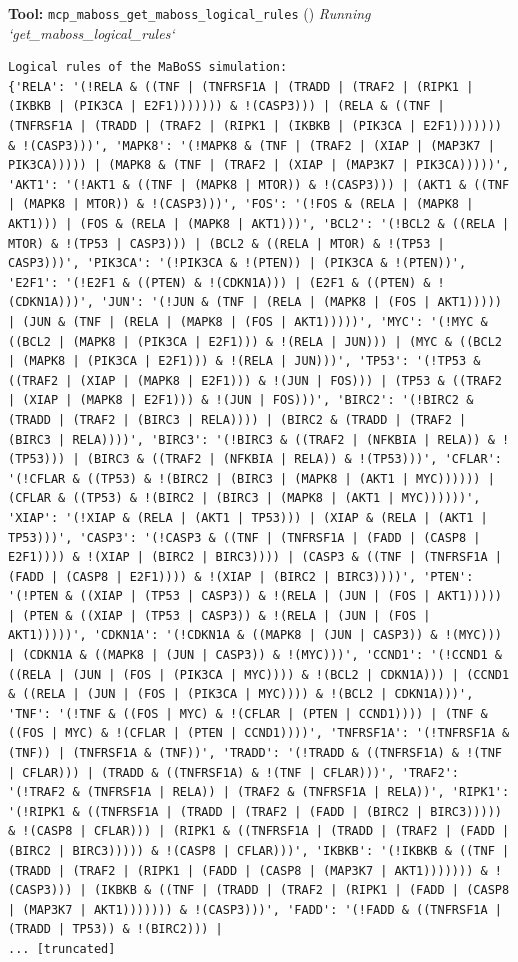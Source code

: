 \documentclass[11pt,a4paper]{article}
\begin{document}
\begin{toolokbox}
\textbf{Tool:} \texttt{mcp\_maboss\_get\_maboss\_logical\_rules} (\checkmark)
\textit{Running `get\_maboss\_logical\_rules`}
\begin{lstlisting}
Logical rules of the MaBoSS simulation:
{'RELA': '(!RELA & ((TNF | (TNFRSF1A | (TRADD | (TRAF2 | (RIPK1 | (IKBKB | (PIK3CA | E2F1))))))) & !(CASP3))) | (RELA & ((TNF | (TNFRSF1A | (TRADD | (TRAF2 | (RIPK1 | (IKBKB | (PIK3CA | E2F1))))))) & !(CASP3)))', 'MAPK8': '(!MAPK8 & (TNF | (TRAF2 | (XIAP | (MAP3K7 | PIK3CA))))) | (MAPK8 & (TNF | (TRAF2 | (XIAP | (MAP3K7 | PIK3CA)))))', 'AKT1': '(!AKT1 & ((TNF | (MAPK8 | MTOR)) & !(CASP3))) | (AKT1 & ((TNF | (MAPK8 | MTOR)) & !(CASP3)))', 'FOS': '(!FOS & (RELA | (MAPK8 | AKT1))) | (FOS & (RELA | (MAPK8 | AKT1)))', 'BCL2': '(!BCL2 & ((RELA | MTOR) & !(TP53 | CASP3))) | (BCL2 & ((RELA | MTOR) & !(TP53 | CASP3)))', 'PIK3CA': '(!PIK3CA & !(PTEN)) | (PIK3CA & !(PTEN))', 'E2F1': '(!E2F1 & ((PTEN) & !(CDKN1A))) | (E2F1 & ((PTEN) & !(CDKN1A)))', 'JUN': '(!JUN & (TNF | (RELA | (MAPK8 | (FOS | AKT1))))) | (JUN & (TNF | (RELA | (MAPK8 | (FOS | AKT1)))))', 'MYC': '(!MYC & ((BCL2 | (MAPK8 | (PIK3CA | E2F1))) & !(RELA | JUN))) | (MYC & ((BCL2 | (MAPK8 | (PIK3CA | E2F1))) & !(RELA | JUN)))', 'TP53': '(!TP53 & ((TRAF2 | (XIAP | (MAPK8 | E2F1))) & !(JUN | FOS))) | (TP53 & ((TRAF2 | (XIAP | (MAPK8 | E2F1))) & !(JUN | FOS)))', 'BIRC2': '(!BIRC2 & (TRADD | (TRAF2 | (BIRC3 | RELA)))) | (BIRC2 & (TRADD | (TRAF2 | (BIRC3 | RELA))))', 'BIRC3': '(!BIRC3 & ((TRAF2 | (NFKBIA | RELA)) & !(TP53))) | (BIRC3 & ((TRAF2 | (NFKBIA | RELA)) & !(TP53)))', 'CFLAR': '(!CFLAR & ((TP53) & !(BIRC2 | (BIRC3 | (MAPK8 | (AKT1 | MYC)))))) | (CFLAR & ((TP53) & !(BIRC2 | (BIRC3 | (MAPK8 | (AKT1 | MYC))))))', 'XIAP': '(!XIAP & (RELA | (AKT1 | TP53))) | (XIAP & (RELA | (AKT1 | TP53)))', 'CASP3': '(!CASP3 & ((TNF | (TNFRSF1A | (FADD | (CASP8 | E2F1)))) & !(XIAP | (BIRC2 | BIRC3)))) | (CASP3 & ((TNF | (TNFRSF1A | (FADD | (CASP8 | E2F1)))) & !(XIAP | (BIRC2 | BIRC3))))', 'PTEN': '(!PTEN & ((XIAP | (TP53 | CASP3)) & !(RELA | (JUN | (FOS | AKT1))))) | (PTEN & ((XIAP | (TP53 | CASP3)) & !(RELA | (JUN | (FOS | AKT1)))))', 'CDKN1A': '(!CDKN1A & ((MAPK8 | (JUN | CASP3)) & !(MYC))) | (CDKN1A & ((MAPK8 | (JUN | CASP3)) & !(MYC)))', 'CCND1': '(!CCND1 & ((RELA | (JUN | (FOS | (PIK3CA | MYC)))) & !(BCL2 | CDKN1A))) | (CCND1 & ((RELA | (JUN | (FOS | (PIK3CA | MYC)))) & !(BCL2 | CDKN1A)))', 'TNF': '(!TNF & ((FOS | MYC) & !(CFLAR | (PTEN | CCND1)))) | (TNF & ((FOS | MYC) & !(CFLAR | (PTEN | CCND1))))', 'TNFRSF1A': '(!TNFRSF1A & (TNF)) | (TNFRSF1A & (TNF))', 'TRADD': '(!TRADD & ((TNFRSF1A) & !(TNF | CFLAR))) | (TRADD & ((TNFRSF1A) & !(TNF | CFLAR)))', 'TRAF2': '(!TRAF2 & (TNFRSF1A | RELA)) | (TRAF2 & (TNFRSF1A | RELA))', 'RIPK1': '(!RIPK1 & ((TNFRSF1A | (TRADD | (TRAF2 | (FADD | (BIRC2 | BIRC3))))) & !(CASP8 | CFLAR))) | (RIPK1 & ((TNFRSF1A | (TRADD | (TRAF2 | (FADD | (BIRC2 | BIRC3))))) & !(CASP8 | CFLAR)))', 'IKBKB': '(!IKBKB & ((TNF | (TRADD | (TRAF2 | (RIPK1 | (FADD | (CASP8 | (MAP3K7 | AKT1))))))) & !(CASP3))) | (IKBKB & ((TNF | (TRADD | (TRAF2 | (RIPK1 | (FADD | (CASP8 | (MAP3K7 | AKT1))))))) & !(CASP3)))', 'FADD': '(!FADD & ((TNFRSF1A | (TRADD | TP53)) & !(BIRC2))) |
... [truncated]
\end{lstlisting}
\end{toolokbox}
\end{document}
